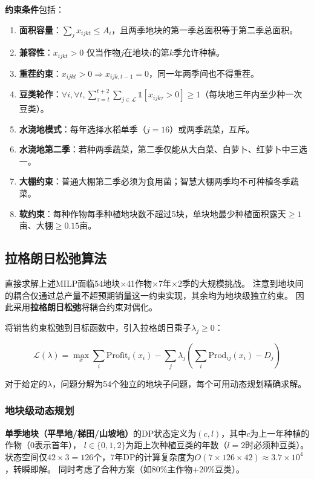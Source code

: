 \documentclass[12pt]{ctexart}
\begin{document}
\textbf{约束条件}包括：
\begin{enumerate}[label=(\arabic*), leftmargin=*]
    \item \textbf{面积容量}：$\sum_{j} x_{ijkt} \le A_i$，且两季地块的第一季总面积等于第二季总面积。
    \item \textbf{兼容性}：$x_{ijkt} > 0$ 仅当作物$j$在地块$i$的第$k$季允许种植。
    \item \textbf{重茬约束}：$x_{ijkt}>0 \Rightarrow x_{ijk,t-1}=0$，同一年两季间也不得重茬。
    \item \textbf{豆类轮作}：$\forall i, \forall t, \sum_{\tau=t}^{t+2} \sum_{j\in\mathcal{L}} \mathbb{1}[x_{ijk\tau}>0] \geq 1$（每块地三年内至少种一次豆类）。
    \item \textbf{水浇地模式}：每年选择水稻单季（$j=16$）或两季蔬菜，互斥。
    \item \textbf{水浇地第二季}：若种两季蔬菜，第二季仅能从大白菜、白萝卜、红萝卜中三选一。
    \item \textbf{大棚约束}：普通大棚第二季必须为食用菌；智慧大棚两季均不可种植冬季蔬菜。
    \item \textbf{软约束}：每种作物每季种植地块数不超过5块，单块地最少种植面积露天$\ge1$亩、大棚$\ge0.15$亩。
\end{enumerate}

\subsection{拉格朗日松弛算法}

直接求解上述MILP面临54地块$\times$41作物$\times$7年$\times$2季的大规模挑战。
注意到地块间的耦合仅通过总产量不超预期销量这一约束实现，其余均为地块级独立约束。
因此采用\textbf{拉格朗日松弛}将耦合约束对偶化。

将销售约束松弛到目标函数中，引入拉格朗日乘子$\lambda_j \geq 0$：

\begin{equation}
    \mathcal{L}(\lambda) = \max_{x} \sum_i \text{Profit}_i(x_i) -
    \sum_j \lambda_j \left(\sum_i \text{Prod}_{ij}(x_i) - D_j\right)
\end{equation}

对于给定的$\lambda$，问题分解为54个独立的地块子问题，每个可用动态规划精确求解。

\subsubsection{地块级动态规划}

\textbf{单季地块（平旱地/梯田/山坡地）}的DP状态定义为$(c, l)$，其中$c$为上一年种植的作物（0表示首年），
$l \in \{0,1,2\}$为距上次种植豆类的年数（$l=2$时必须种豆类）。
状态空间仅$42 \times 3 = 126$个，7年DP的计算复杂度为$O(7 \times 126 \times 42) \approx 3.7\times10^4$，转瞬即解。
同时考虑了合种方案（如80\%主作物+20\%豆类）。
\end{document}
